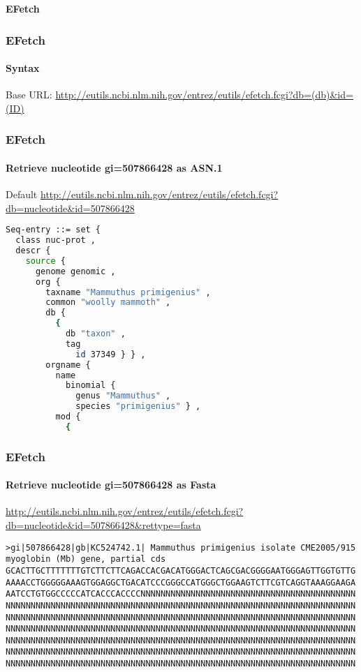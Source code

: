\documentclass{beamer}
\newcommand{\centeredtitle}[1]{
\begin{center}
    \Huge{\bf{#1}}
\end{center}
}
\newcommand{\hugeslide}[1]{
\begin{frame}
\centeredtitle{#1}
\end{frame}
}
\begin{document}

\hugeslide{EFetch}


\begin{frame}[fragile]
\frametitle{EFetch}
\framesubtitle{Syntax}
Base URL:
\url{http://eutils.ncbi.nlm.nih.gov/entrez/eutils/efetch.fcgi?db=(db)\&id=(ID)}
\end{frame}

\begin{frame}[fragile]
\frametitle{EFetch}
\framesubtitle{Retrieve nucleotide gi=507866428 as ASN.1}

Default 
\url{http://eutils.ncbi.nlm.nih.gov/entrez/eutils/efetch.fcgi?db=nucleotide&id=507866428}
\begin{lstlisting}[language=bash,basicstyle=\tiny,breaklines=true]
Seq-entry ::= set {
  class nuc-prot ,
  descr {
    source {
      genome genomic ,
      org {
        taxname "Mammuthus primigenius" ,
        common "woolly mammoth" ,
        db {
          {
            db "taxon" ,
            tag
              id 37349 } } ,
        orgname {
          name
            binomial {
              genus "Mammuthus" ,
              species "primigenius" } ,
          mod {
            {

\end{lstlisting}
\end{frame}

\begin{frame}[fragile]
\frametitle{EFetch}
\framesubtitle{Retrieve nucleotide gi=507866428 as Fasta}
\url{http://eutils.ncbi.nlm.nih.gov/entrez/eutils/efetch.fcgi?db=nucleotide&id=507866428&rettype=fasta}
\begin{lstlisting}[basicstyle=\tiny,breaklines=true]
>gi|507866428|gb|KC524742.1| Mammuthus primigenius isolate CME2005/915 myoglobin (Mb) gene, partial cds
GCACTTGCTTTTTTTGTCTTCTTCAGACCACGACATGGGACTCAGCGACGGGGAATGGGAGTTGGTGTTG
AAAACCTGGGGGAAAGTGGAGGCTGACATCCCGGGCCATGGGCTGGAAGTCTTCGTCAGGTAAAGGAAGA
AATCCTGTGGCCCCCATCACCCACCCCNNNNNNNNNNNNNNNNNNNNNNNNNNNNNNNNNNNNNNNNNNN
NNNNNNNNNNNNNNNNNNNNNNNNNNNNNNNNNNNNNNNNNNNNNNNNNNNNNNNNNNNNNNNNNNNNNN
NNNNNNNNNNNNNNNNNNNNNNNNNNNNNNNNNNNNNNNNNNNNNNNNNNNNNNNNNNNNNNNNNNNNNN
NNNNNNNNNNNNNNNNNNNNNNNNNNNNNNNNNNNNNNNNNNNNNNNNNNNNNNNNNNNNNNNNNNNNNN
NNNNNNNNNNNNNNNNNNNNNNNNNNNNNNNNNNNNNNNNNNNNNNNNNNNNNNNNNNNNNNNNNNNNNN
NNNNNNNNNNNNNNNNNNNNNNNNNNNNNNNNNNNNNNNNNNNNNNNNNNNNNNNNNNNNNNNNNNNNNN
NNNNNNNNNNNNNNNNNNNNNNNNNNNNNNNNNNNNNNNNNNNNNNNNNNNNNNNNNNNNNNNNNNNNNN
\end{lstlisting}
\end{frame}
\end{document}

